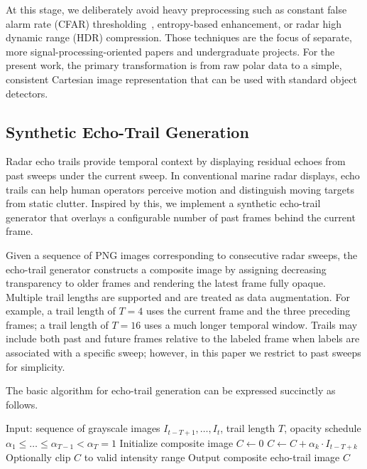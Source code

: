 \documentclass[twocolumn, 10pt]{article}
\begin{document}
At this stage, we deliberately avoid heavy preprocessing such as constant false alarm rate (CFAR) thresholding~\cite{rashid2025cfar_sar_vessels}, entropy-based enhancement, or radar high dynamic range (HDR) compression. Those techniques are the focus of separate, more signal-processing-oriented papers and undergraduate projects. For the present work, the primary transformation is from raw polar data to a simple, consistent Cartesian image representation that can be used with standard object detectors.

\subsection{Synthetic Echo-Trail Generation}
Radar echo trails provide temporal context by displaying residual echoes from past sweeps under the current sweep. In conventional marine radar displays, echo trails can help human operators perceive motion and distinguish moving targets from static clutter. Inspired by this, we implement a synthetic echo-trail generator that overlays a configurable number of past frames behind the current frame.

Given a sequence of PNG images corresponding to consecutive radar sweeps, the echo-trail generator constructs a composite image by assigning decreasing transparency to older frames and rendering the latest frame fully opaque. Multiple trail lengths are supported and are treated as data augmentation. For example, a trail length of $T=4$ uses the current frame and the three preceding frames; a trail length of $T=16$ uses a much longer temporal window. Trails may include both past and future frames relative to the labeled frame when labels are associated with a specific sweep; however, in this paper we restrict to past sweeps for simplicity.

The basic algorithm for echo-trail generation can be expressed succinctly as follows.

\begin{algorithm}[t]
\caption{Synthetic Echo-Trail Generation}
\label{alg:echo}
\begin{algorithmic}
\State Input: sequence of grayscale images $I_{t-T+1}, \dots, I_{t}$, trail length $T$, opacity schedule $\alpha_{1} \leq \dots \leq \alpha_{T-1} < \alpha_{T}=1$
\State Initialize composite image $C \gets 0$
  \State $C \gets C + \alpha_{k} \cdot I_{t-T+k}$
\EndFor
\State Optionally clip $C$ to valid intensity range
\State Output composite echo-trail image $C$
\end{algorithmic}
\end{algorithm}
\end{document}
